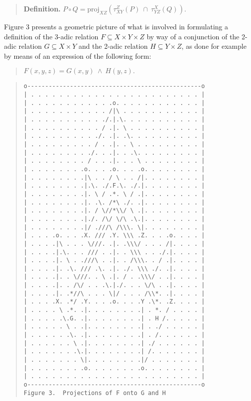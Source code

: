 \documentclass[12pt]{article}
\begin{document}
\begin{quote}
\textbf{Definition.}  $P \circ Q = \mathrm{proj}_{XZ}(\tau_{XY}^Z(P)\ \cap\ \tau_{YZ}^X(Q)).$
\end{quote}

Figure 3 presents a geometric picture of what is involved in formulating a definition of the 3-adic relation $F \subseteq X \times Y \times Z$ by way of a conjunction of the 2-adic relation $G \subseteq X \times Y$ and the 2-adic relation $H \subseteq Y \times Z$, as done for example by means of an expression of the following form:

\begin{quote}
$F(x, y, z) = G(x, y)\ \land\ H(y, z).$
\end{quote}

\begin{quote}\begin{verbatim}
o-------------------------------------------------o
| . . . . . . . . . . . . . . . . . . . . . . . . |
| . . . . . . . . . . . .o. . . . . . . . . . . . |
| . . . . . . . . . . . /|\ . . . . . . . . . . . |
| . . . . . . . . . . ./.|.\. . . . . . . . . . . |
| . . . . . . . . . . / .|. \ . . . . . . . . . . |
| . . . . . . . . . ./. .|. .\. . . . . . . . . . |
| . . . . . . . . . / . .|. . \ . . . . . . . . . |
| . . . . . . . . ./. . .|. . .\. . . . . . . . . |
| . . . . . . . . / . . .|. . . \ . . . . . . . . |
| . . . . . . . .o. . . .o. . . .o. . . . . . . . |
| . . . . . . . .|\ . . / \ . . /|. . . . . . . . |
| . . . . . . . .|.\. ./.F.\. ./.|. . . . . . . . |
| . . . . . . . .|. \ / .*. \ / .|. . . . . . . . |
| . . . . . . . .|. .\. /*\ ./. .|. . . . . . . . |
| . . . . . . . .|. / \//*\\/ \ .|. . . . . . . . |
| . . . . . . . .|./. /\/ \/\ .\.|. . . . . . . . |
| . . . . . . . .|/ .///\ /\\\. \|. . . . . . . . |
| . . . .o. . . .X. /// .Y. \\\ .Z. . . .o. . . . |
| . . . .|\ . . . \///. .|. .\\\/ . . . /|. . . . |
| . . . .|.\. . . /// . .|. . \\\ . . ./.|. . . . |
| . . . .|. \ . .///\ . .|. . /\\\. . / .|. . . . |
| . . . .|. .\. /// .\. .|. ./. \\\ ./. .|. . . . |
| . . . .|. . \///. . \ .|. / . .\\\/ . .|. . . . |
| . . . .|. . /\/ . . .\.|./. . . \/\ . .|. . . . |
| . . . .|. .*//\ . . . \|/ . . . /\\*. .|. . . . |
| . . . .X. .*/ .Y. . . .o. . . .Y .\*. .Z. . . . |
| . . . . \ .*. .|. . . . . . . .| . *. / . . . . |
| . . . . .\.G. .|. . . . . . . .| . H /. . . . . |
| . . . . . \ . .|. . . . . . . .| . ./ . . . . . |
| . . . . . .\. .|. . . . . . . .| . /. . . . . . |
| . . . . . . \ .|. . . . . . . .| ./ . . . . . . |
| . . . . . . .\.|. . . . . . . .| /. . . . . . . |
| . . . . . . . \|. . . . . . . .|/ . . . . . . . |
| . . . . . . . .o. . . . . . . .o. . . . . . . . |
| . . . . . . . . . . . . . . . . . . . . . . . . |
o-------------------------------------------------o
Figure 3.  Projections of F onto G and H
\end{verbatim}\end{quote}
\end{document}
